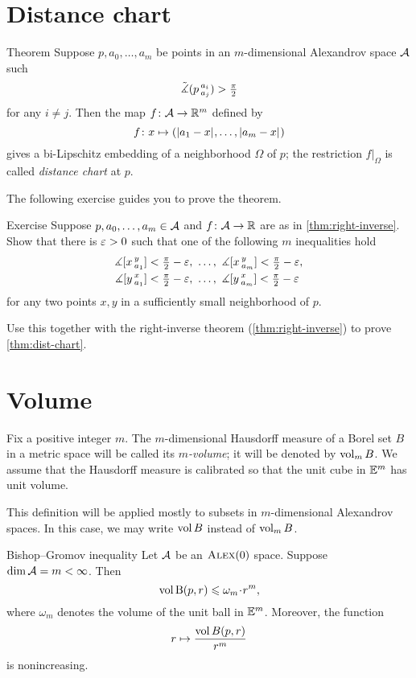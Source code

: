 \section{Distance chart}

\begin{thm}{Theorem}\label{thm:dist-chart}
Suppose $p,a_0,\dots,a_m$ be points in an $m$-dimensional Alexandrov space $\mathcal{A}$ such
\[\tilde\measuredangle(p\,{}^{a_i}_{a_j})>\tfrac\pi2\]
for any $i\ne j$.
Then the map $f\colon\mathcal{A}\to\mathbb{R}^m$ defined by
\[f\colon x\mapsto (|{a_1}-{x}|_{}^{{}},\dots,|{a_m}-{x}|_{}^{{}})\]
gives a bi-Lipschitz embedding of a neighborhood $\Omega$ of $p$;
the restriction $f|_\Omega$ is called \emph{distance chart} at $p$.
\end{thm}

The following exercise guides you to prove the theorem.

\begin{thm}{Exercise}\label{ex:proof-dist-chart}
Suppose $p,a_0,\dots,a_m\in\mathcal{A}$ and $f\colon\mathcal{A}\to\mathbb{R}$ are as in \ref{thm:right-inverse}.
Show that there is $\varepsilon>0$ such that one of the following $m$ inequalities hold
\begin{align*}
\measuredangle[x\,{}^{y}_{a_1}]&<\tfrac\pi2-\varepsilon,\ \dots,\  \measuredangle[x\,{}^{y}_{a_m}]<\tfrac\pi2-\varepsilon,
\\
\measuredangle[y\,{}^{x}_{a_1}]&<\tfrac\pi2-\varepsilon,\ \dots,\ \measuredangle[y\,{}^{x}_{a_m}]<\tfrac\pi2-\varepsilon
\end{align*}
for any two points $x,y$ in a sufficiently small neighborhood of $p$.

Use this together with the right-inverse theorem (\ref{thm:right-inverse}) to prove \ref{thm:dist-chart}.
\end{thm}

\section{Volume}

Fix a positive integer $m$.
The $m$-dimensional Hausdorff measure of a Borel set $B$ in a metric space will be called its \emph{$m$-volume}; it will be denoted by $\operatorname{\rm vol}\nolimits_m B$.
We assume that the Hausdorff measure is calibrated so that the unit cube in $\mathbb{E}^m$ has unit volume.

This definition will be applied mostly to subsets in $m$-dimensional Alexandrov spaces.
In this case, we may write $\operatorname{\rm vol}\nolimits B$ instead of $\operatorname{\rm vol}\nolimits_m B$.


\begin{thm}{Bishop--Gromov inequality}\label{inq:BG}
Let $\mathcal{A}$ be an $\textsc{Alex}(0)$ space.
Suppose $\operatorname{\rm dim}\nolimits \mathcal{A}=m<\infty$.
Then 
\[\vol \oBall(p,r)\le \omega_m\cdot r^m,\]
where $\omega_m$ denotes the volume of the unit ball in $\mathbb{E}^m$.
Moreover, the function 
\[r\mapsto \frac{\operatorname{\rm vol}\nolimits B(p,r)}{r^m}\]
is nonincreasing.
\end{thm}

